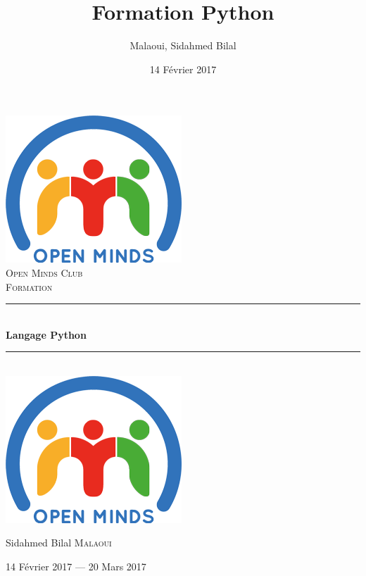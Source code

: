 \documentclass[12pt]{article}
\title{Formation Python}
\author{Malaoui, Sidahmed Bilal}
\date{14 Février 2017}
\begin{document}

\newcommand{\hsp}{\hspace{20pt}}
\newcommand{\HRule}{\rule{\linewidth}{0.5mm}}
\begin{titlepage}
  \begin{sffamily}
  \begin{center}

    \includegraphics[width=0.5\linewidth]{img/OMC_logo.png}~\\[1.5cm]

    \textsc{\LARGE Open Minds Club}\\[2cm]

    \textsc{\Large Formation}\\[1.5cm]

    \HRule \\[0.4cm]
    { \huge \bfseries Langage Python\\[0.4cm] }

    \HRule \\[2cm]
    \includegraphics[scale=0.2]{img/OMC_logo.png}
    \\[2cm]

    \begin{minipage}{0.4\textwidth}
      \begin{center} \large
        Sidahmed Bilal \textsc{Malaoui}\\
      \end{center}
    \end{minipage}

    \vfill

    {\large 14\iemes{} Février 2017 — 20 Mars 2017}

  \end{center}
  \end{sffamily}
\end{titlepage}
\end{document}
